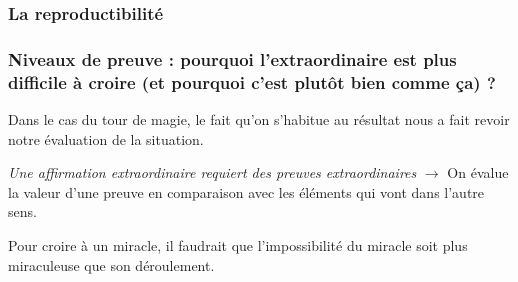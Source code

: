 \documentclass{beamer}
\begin{document}
\begin{frame}[plain]


\end{frame}


\begin{frame}[plain]
    \frametitle{La reproductibilité}


\vspace{1cm}


\vspace{1cm}


\end{frame}

\begin{frame}[plain]
    \frametitle{Niveaux de preuve : pourquoi l'extraordinaire est plus difficile à croire (et pourquoi c'est plutôt bien comme ça) ?}

    Dans le cas du tour de magie, le fait qu'on s'habitue au résultat nous a fait revoir notre évaluation de la situation. \pause

    \vspace{1cm}

    \textit{Une affirmation extraordinaire requiert des preuves extraordinaires} \pause \alert{$\rightarrow$} On évalue la valeur d'une preuve en comparaison avec les éléments qui vont dans l'autre sens. \pause

    \vspace{1cm}

    Pour croire à un miracle, il faudrait que l'impossibilité du miracle soit plus miraculeuse que son déroulement.


\end{frame}
\end{document}
